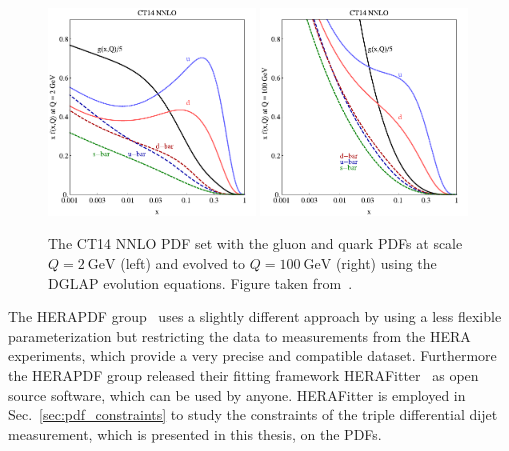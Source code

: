 \begin{figure}[htb] 
    \centering
    \includegraphics[width=0.49\textwidth]{figures/sm_model/ct14_2.pdf}\hfill
    \includegraphics[width=0.49\textwidth]{figures/sm_model/ct14_100.pdf}
    \caption[CT14 NNLO PDF sets]{The CT14 NNLO PDF set with the gluon and quark
        PDFs at scale $Q=\SI{2}{\GeV}$ (left) and evolved to $Q=\SI{100}{\GeV}$
    (right) using the DGLAP evolution equations. Figure taken
    from~\cite{Dulat:2015mca}.}
    \label{fig:ct14_parton_distributions} 
\end{figure}

The HERAPDF group~\cite{Abramowicz:2015mha} uses a slightly different approach
by using a less flexible parameterization but restricting the data to
measurements from the HERA experiments, which provide a very precise and
compatible dataset. Furthermore the HERAPDF group released their fitting
framework HERAFitter~\cite{Alekhin:2014irh} as open source software, which can
be used by anyone.  HERAFitter is employed in Sec.~\ref{sec:pdf_constraints} to
study the constraints of the triple differential dijet measurement, which is
presented in this thesis, on the PDFs.

